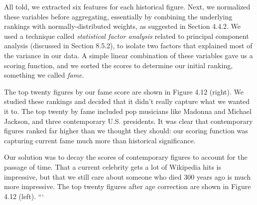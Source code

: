 \documentclass[10pt]{article}
\begin{document}
All told, we extracted six features for each historical figure. Next, we normalized these variables before aggregating, essentially by combining the underlying rankings with normally-distributed weights, as suggested in Section 4.4.2. We used a technique called \textit{statistical factor analysis} related to principal component analysis (discussed in Section 8.5.2), to isolate two factors that explained most of the variance in our data. A simple linear combination of these variables gave us a scoring function, and we sorted the scores to determine our initial ranking, something we called \textit{fame}.

The top twenty figures by our fame score are shown in Figure 4.12 (right). We studied these rankings and decided that it didn’t really capture what we wanted it to. The top twenty by fame included pop musicians like Madonna and Michael Jackson, and three contemporary U.S. presidents. It was clear that contemporary figures ranked far higher than we thought they should: our scoring function was capturing current fame much more than historical significance.

Our solution was to decay the scores of contemporary figures to account for the passage of time. That a current celebrity gets a lot of Wikipedia hits is impressive, but that we still care about someone who died 300 years ago is much more impressive. The top twenty figures after age correction are shown in Figure 4.12 (left).
```
\end{document}
